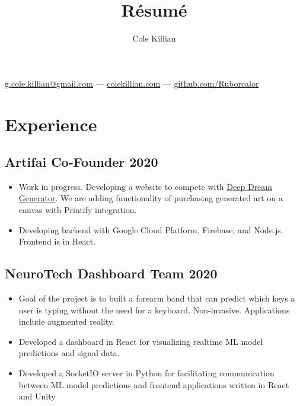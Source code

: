 \documentclass{article}
\makeatletter
\renewcommand{\maketitle}{
\begin{center}
{\color{green}\huge\bfseries
\theauthor}

\vspace{.25em}
\href{mailto:g.cole.killian@gmail.com}{g.cole.killian@gmail.com} --- \href{https://colekillian.com}{colekillian.com} --- \href{https://github.com/Ruborcalor}{github.com/Ruborcalor} 
\end{center}
}
\makeatother
\begin{document}
\title{R\'esum\'e}
\author{Cole Killian}

\maketitle
\thispagestyle{empty} 

\section{Experience}


\subsection{Artifai Co-Founder \hfill 2020}
\begin{itemize}[leftmargin=0.5in]
  \setlength\itemsep{0.00em}
\item Work in progress. Developing a website to compete with
  \href{https://deepdreamgenerator.com}{Deep Dream Generator}. We are adding
  functionality of purchasing generated art on a canvas with Printify integration.
\item Developing backend with Google Cloud Platform, Firebase, and Node.js. Frontend is in React.
\end{itemize}



\subsection{NeuroTech Dashboard Team \hfill 2020}
\begin{itemize}[leftmargin=0.5in]
  \setlength\itemsep{0.00em}
\item Goal of the project is to built a forearm band that can predict which keys a
  user is typing without the need for a keyboard. Non-invasive. Applications
  include augmented reality.
\item Developed a dashboard in React for visualizing realtime
  ML model predictions and signal data.
\item Developed a SocketIO server in Python for facilitating communication
  between ML model predictions and frontend applications written in React and Unity
\end{itemize}
\end{document}
